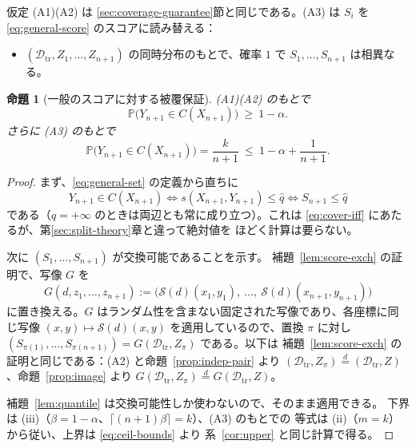 \documentclass[a4paper,11pt]{jsarticle}
\theoremstyle{definition}
\theoremstyle{plain}
\newtheorem{proposition}[definition]{命題}
\theoremstyle{remark}
\newcommand{\Prob}{\mathbb{P}}
\newcommand{\eqd}{\overset{d}{=}}               %
\newcommand{\Dtr}{\mathcal{D}_{\mathrm{tr}}}     %
\newcommand{\qhat}{\hat{q}}
\begin{document}
仮定 (A1)(A2) は \ref{sec:coverage-guarantee}節と同じである。(A3) は $S_i$ を
\eqref{eq:general-score} のスコアに読み替える：
\begin{itemize}
  \item[\textbf{(A3)}] $(\Dtr,Z_1,\dots,Z_{n+1})$ の同時分布のもとで、確率 $1$ で
    $S_1,\dots,S_{n+1}$ は相異なる。
\end{itemize}

\begin{proposition}[一般のスコアに対する被覆保証]
  \label{prop:general-score}
  (A1)(A2) のもとで
  \begin{equation*}
    \Prob\bigl(Y_{n+1}\in C(X_{n+1})\bigr)\ \ge\ 1-\alpha .
  \end{equation*}
  さらに (A3) のもとで
  \begin{equation*}
    \Prob\bigl(Y_{n+1}\in C(X_{n+1})\bigr)=\frac{k}{n+1}\ \le\ 1-\alpha+\frac{1}{n+1}.
  \end{equation*}
\end{proposition}

\begin{proof}
  まず、\eqref{eq:general-set} の定義から直ちに
  \begin{equation*}
    Y_{n+1}\in C(X_{n+1})\iff s(X_{n+1},Y_{n+1})\le\qhat\iff S_{n+1}\le\qhat
  \end{equation*}
  である（$\qhat=+\infty$ のときは両辺とも常に成り立つ）。これは
  \eqref{eq:cover-iff} にあたるが、第\ref{sec:split-theory}章と違って絶対値を
  ほどく計算は要らない。

  次に $(S_1,\dots,S_{n+1})$ が交換可能であることを示す。
  補題~\ref{lem:score-exch} の証明で、写像 $G$ を
  \begin{equation*}
    G(d,z_1,\dots,z_{n+1})
    :=\bigl(\mathcal{S}(d)(x_1,y_1),\ \dots,\ \mathcal{S}(d)(x_{n+1},y_{n+1})\bigr)
  \end{equation*}
  に置き換える。$G$ はランダム性を含まない固定された写像であり、各座標に同じ写像
  $(x,y)\mapsto\mathcal{S}(d)(x,y)$ を適用しているので、置換 $\pi$ に対し
  $(S_{\pi(1)},\dots,S_{\pi(n+1)})=G(\Dtr,Z_\pi)$ である。以下は
  補題~\ref{lem:score-exch} の証明と同じである：(A2) と命題~\ref{prop:indep-pair} より
  $(\Dtr,Z_\pi)\eqd(\Dtr,Z)$、命題~\ref{prop:image} より
  $G(\Dtr,Z_\pi)\eqd G(\Dtr,Z)$。

  補題~\ref{lem:quantile} は交換可能性しか使わないので、そのまま適用できる。
  下界は (iii)（$\beta=1-\alpha$、$\lceil(n+1)\beta\rceil=k$）、(A3) のもとでの
  等式は (ii)（$m=k$）から従い、上界は \eqref{eq:ceil-bounds} より
  系~\ref{cor:upper} と同じ計算で得る。
\end{proof}
\end{document}
